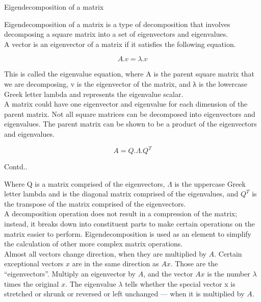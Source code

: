 \documentclass{beamer}
\begin{document}
\begin{frame}{Eigendecomposition of a matrix}
		\begin{flushleft}
			Eigendecomposition of a matrix is a type of decomposition that involves decomposing a square matrix into a set of eigenvectors and eigenvalues. \\
	\vspace{10pt}
			A vector is an eigenvector of a matrix if it satisfies the following equation.
		\end{flushleft}
	\vspace{-10pt}
		\begin{equation*}
			A.v = \lambda.v
		\end{equation*}
		\begin{flushleft}
		This is called the eigenvalue equation, where A is the parent square matrix that we are decomposing, v is the eigenvector of the matrix, and λ is the lowercase Greek letter lambda and represents the eigenvalue scalar. \\
	\vspace{10pt}
		A matrix could have one eigenvector and eigenvalue for each dimension of the parent matrix. Not all square matrices can be decomposed into eigenvectors and eigenvalues. The parent matrix can be shown to be a product of the eigenvectors and eigenvalues.
		\end{flushleft}
		\begin{equation*}
			A = Q.\Lambda.Q^T
		\end{equation*}
\end{frame}
\begin{frame}{Contd..}
	\begin{flushleft}
		Where Q is a matrix comprised of the eigenvectors, $\Lambda$ is the uppercase Greek letter lambda	and is the diagonal matrix comprised of the eigenvalues, and $Q^T$ is the transpose of the matrix comprised of the eigenvectors. \\ 
\vspace{10pt}
	A decomposition operation does not result in a compression of the matrix; instead, it breaks down into constituent parts to make certain operations on the matrix easier to perform. Eigendecomposition is used as an element to simplify the calculation of other more complex matrix operations. \\
\vspace{10pt}
	Almost all vectors change direction, when they are multiplied by $A$. Certain exceptional vectors $x$ are in the same direction as $Ax$. Those are the “eigenvectors”. Multiply an eigenvector by $A$, and the vector $Ax$ is the number $\lambda$ times the original $x$. The eigenvalue $\lambda$ tells whether the special vector x is stretched or shrunk or reversed or left unchanged — when it is multiplied by $A$.
	\end{flushleft}
\end{frame}
\end{document}
